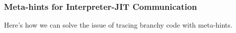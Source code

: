 \subsubsection{Meta-hints for Interpreter-JIT Communication}
\label{subsubsec:meta-hints}

Here's how we can solve the issue of tracing branchy code with
meta-hints.
